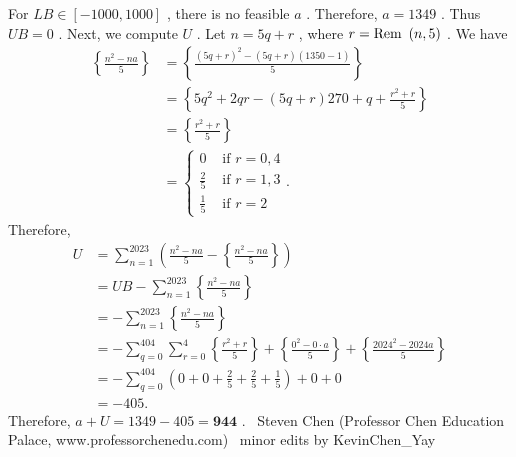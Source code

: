 \documentclass[12pt]{article}
\begin{document}
For $LB \in \left[ - 1000, 1000 \right]$ , there is no feasible $a$ . Therefore, $a = 1349$ . Thus $UB = 0$ . Next, we compute $U$ . Let $n = 5 q + r$ , where $r = {\rm Rem} \ \left( n, 5 \right)$ . We have \begin{align*} \left\{ \frac{n^2 - na}{5} \right\} & = \left\{ \frac{\left( 5 q + r \right)^2 - \left( 5 q + r \right)\left( 1350 - 1 \right)}{5} \right\} \\ & = \left\{ 5 q^2 + 2 q r - \left( 5 q + r \right) 270 + q + \frac{r^2 + r}{5} \right\} \\ & = \left\{\frac{r^2 + r}{5} \right\} \\ & = \left\{ \begin{array}{ll} 0 & \mbox{ if } r = 0, 4 \\ \frac{2}{5} & \mbox{ if } r = 1, 3 \\ \frac{1}{5} & \mbox{ if } r = 2 \end{array} \right. . \end{align*} Therefore, \begin{align*} U & = \sum_{n=1}^{2023} \left( \frac{n^2 - na}{5} - \left\{ \frac{n^2 - na}{5} \right\} \right) \\ & = UB - \sum_{n=1}^{2023} \left\{ \frac{n^2 - na}{5} \right\} \\ & = - \sum_{n=1}^{2023} \left\{ \frac{n^2 - na}{5} \right\} \\ & = - \sum_{q=0}^{404} \sum_{r=0}^4 \left\{\frac{r^2 + r}{5} \right\} + \left\{ \frac{0^2 - 0 \cdot a}{5} \right\} + \left\{ \frac{2024^2 - 2024a}{5} \right\} \\ & = - \sum_{q=0}^{404} \left( 0 + 0 + \frac{2}{5} + \frac{2}{5} + \frac{1}{5} \right) + 0 + 0 \\ & = - 405 . \end{align*} Therefore, $a + U = 1349 - 405 = \boxed{\textbf{944}}$ . ~Steven Chen (Professor Chen Education Palace, www.professorchenedu.com) ~minor edits by KevinChen_Yay
\end{document}

